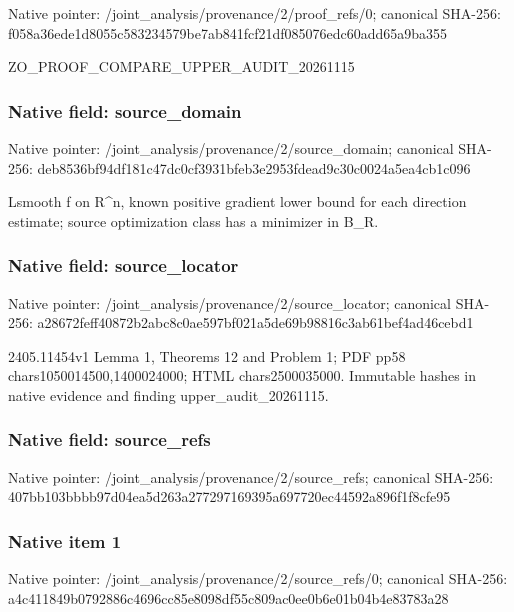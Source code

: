 \documentclass[10pt,a4paper]{article}
\begin{document}
Native pointer: /joint\_analysis/provenan\allowbreak{}ce/2/proof\_refs/0; canonical SHA-256: f058a36ede1d8055c5832345\allowbreak{}79be7ab841fcf21df085076e\allowbreak{}dc60add65a9ba355


ZO\_PROOF\_COMPARE\_UPPER\_AUDIT\_20261115


\subsubsection{Native field: source\_domain}


Native pointer: /joint\_analysis/provenan\allowbreak{}ce/2/source\_domain; canonical SHA-256: deb8536bf94df181c47dc0cf\allowbreak{}3931bfeb3e2953fdead9c30c\allowbreak{}0024a5ea4cb1c096


Lsmooth f on R\textasciicircum{}n, known positive gradient lower bound for each direction estimate; source optimization class has a minimizer in B\_R.


\subsubsection{Native field: source\_locator}


Native pointer: /joint\_analysis/provenan\allowbreak{}ce/2/source\_locator; canonical SHA-256: a28672feff40872b2abc8c0a\allowbreak{}e597bf021a5de69b98816c3a\allowbreak{}b61bef4ad46cebd1


2405.11454v1 Lemma 1, Theorems 12 and Problem 1; PDF pp58 chars1050014500,1400024000; HTML chars2500035000. Immutable hashes in native evidence and finding upper\_audit\_20261115.


\subsubsection{Native field: source\_refs}


Native pointer: /joint\_analysis/provenan\allowbreak{}ce/2/source\_refs; canonical SHA-256: 407bb103bbbb97d04ea5d263\allowbreak{}a277297169395a697720ec44\allowbreak{}592a896f1f8cfe95



\subsubsection{Native item 1}


Native pointer: /joint\_analysis/provenan\allowbreak{}ce/2/source\_refs/0; canonical SHA-256: a4c411849b0792886c4696cc\allowbreak{}85e8098df55c809ac0ee0b6e\allowbreak{}01b04b4e83783a28
\end{document}

